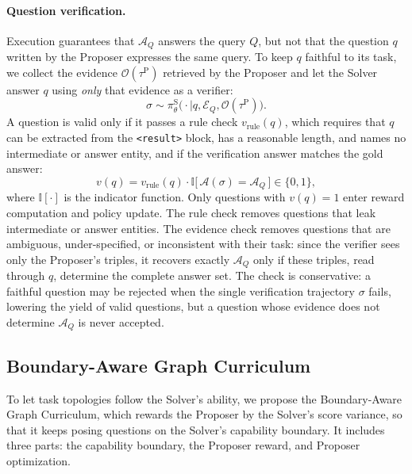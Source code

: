 \paragraph{Question verification.}
Execution guarantees that $\mathcal{A}_Q$ answers the query $Q$, but not that the question $q$ written by the Proposer expresses the same query. To keep $q$ faithful to its task, we collect the evidence $\mathcal{O}(\tau^{\mathrm{P}})$ retrieved by the Proposer and let the Solver answer $q$ using \emph{only} that evidence as a verifier:
\begin{equation}
\label{eq:verify}
\sigma\sim\pi_\theta^{\mathrm{S}}\bigl(\cdot\mid q,\mathcal{E}_Q,\mathcal{O}(\tau^{\mathrm{P}})\bigr).
\end{equation}
A question is valid only if it passes a rule check $v_{\mathrm{rule}}(q)$, which requires that $q$ can be extracted from the \texttt{<result>} block, has a reasonable length, and names no intermediate or answer entity, and if the verification answer matches the gold answer:
\begin{equation}
\label{eq:valid}
v(q)=v_{\mathrm{rule}}(q)\cdot\mathbb{I}\bigl[\,\mathcal{A}(\sigma)=\mathcal{A}_Q\,\bigr]\in\{0,1\},
\end{equation}
where $\mathbb{I}[\cdot]$ is the indicator function. Only questions with $v(q)=1$ enter reward computation and policy update. The rule check removes questions that leak intermediate or answer entities. The evidence check removes questions that are ambiguous, under-specified, or inconsistent with their task: since the verifier sees only the Proposer's triples, it recovers exactly $\mathcal{A}_Q$ only if these triples, read through $q$, determine the complete answer set. The check is conservative: a faithful question may be rejected when the single verification trajectory $\sigma$ fails, lowering the yield of valid questions, but a question whose evidence does not determine $\mathcal{A}_Q$ is never accepted.

\subsection{Boundary-Aware Graph Curriculum}
\label{sec:frontier}

To let task topologies follow the Solver's ability, we propose the Boundary-Aware Graph Curriculum, which rewards the Proposer by the Solver's score variance, so that it keeps posing questions on the Solver's capability boundary. It includes three parts: the capability boundary, the Proposer reward, and Proposer optimization.

